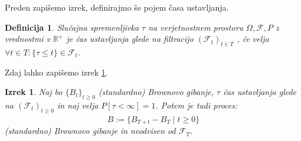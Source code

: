 \documentclass[a4paper,11pt]{article}
\newtheorem{izrek}{Izrek}
\newtheorem{definicija}{Definicija}
\newcommand{\f}{\mathcal{F}}
\begin{document}
Preden zapišemo izrek, definirajmo še pojem časa ustavljanja.


\begin{definicija}
    Slučajna spremenljivka $\tau$ na verjetnostnem prostoru $\Omega, \f, P$ z vrednostmi v $\mathbb{R} ^+$
    je \emph{čas ustavljanja glede} na filtracijo $(\f_t)_{t \in T}$ , če velja $\forall t \in T : \{\tau \leq t\} \in \f_t$.
\end{definicija}

Zdaj lahko zapišemo izrek \ref{thm:stopped_brownian}. %


\begin{izrek}
    \label{thm:stopped_brownian}
    Naj bo $\{B_t\}_{t \geq 0}$ (standardno) Brownovo gibanje, $\tau$ čas ustavljanja glede na 
    $(\f_t)_{t\geq 0}$ in naj velja $P[\tau < \infty] = 1$.
    Potem je tudi proces:
    \[
    \hat{B} := \{B_{T+t} - B_T \mid t \geq 0\}
    \]
    (standardno) Brownovo gibanje in neodvisen od $\f_T$.
\end{izrek}




    
\end{document}
